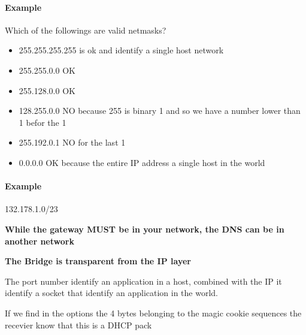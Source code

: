 \paragraph{Example}
Which of the followings are valid netmasks?
\begin{itemize}
\item 255.255.255.255 is ok and identify a single host network
\item 255.255.0.0 OK
\item 255.128.0.0 OK
\item 128.255.0.0 NO because 255 is binary 1 and so we have a number lower than 1 befor the 1
\item 255.192.0.1 NO for the last 1
\item 0.0.0.0 OK because the entire IP address a single host in the world
\end{itemize} 

\paragraph{Example}
132.178.1.0/23

\textbf{While the gateway MUST be in your network, the DNS can be in another network}

\textbf{The Bridge is transparent from the IP layer}

The port number identify an application in a host, combined with the IP it identify a socket that identify an application in the world.


If we find in the options the 4 bytes belonging to the magic cookie sequences the recevier know that this is a DHCP pack



